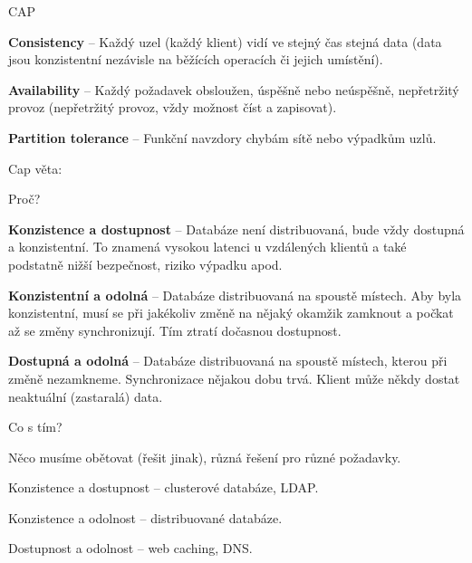 \begin{compactitem}
    \item CAP \begin{compactitem}
        \item \textbf{Consistency} -- Každý uzel (každý klient) vidí ve stejný čas stejná data (data jsou konzistentní nezávisle na běžících operacích či jejich umístění).

        \item \textbf{Availability} -- Každý požadavek obsloužen, úspěšně nebo neúspěšně, nepřetržitý provoz (nepřetržitý provoz, vždy možnost číst a zapisovat).

        \item \textbf{Partition tolerance} -- Funkční navzdory chybám sítě nebo výpadkům uzlů.
    \end{compactitem}

    \item Cap věta: 

    \item Proč? \begin{compactitem}
        \item \textbf{Konzistence a dostupnost} -- Databáze není distribuovaná, bude vždy dostupná a konzistentní. To znamená vysokou latenci u vzdálených klientů a také podstatně nižší bezpečnost, riziko výpadku apod.

        \item \textbf{Konzistentní a odolná} -- Databáze distribuovaná na spoustě místech. Aby byla konzistentní, musí se při jakékoliv změně na nějaký okamžik zamknout a počkat až se změny synchronizují. Tím ztratí dočasnou dostupnost.

        \item \textbf{Dostupná a odolná} -- Databáze distribuovaná na spoustě místech, kterou při změně nezamkneme. Synchronizace nějakou dobu trvá. Klient může někdy dostat neaktuální (zastaralá) data.
    \end{compactitem}

    \item Co s tím? \begin{compactitem}
        \item Něco musíme obětovat (řešit jinak), různá řešení pro různé požadavky.

        \item Konzistence a dostupnost -- clusterové databáze, LDAP.

        \item Konzistence a odolnost -- distribuované databáze.

        \item Dostupnost a odolnost -- web caching, DNS.
    \end{compactitem}
\end{compactitem}

